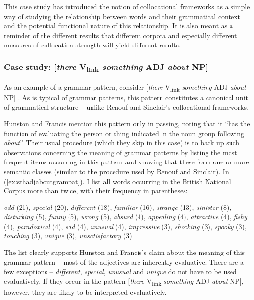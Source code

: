 This case study has introduced the notion of collocational frameworks as a simple way of studying the relationship between words and their grammatical context and the potential functional nature of this relationship. It is also meant as a reminder of the different results that different corpora and especially different measures of collocation strength will yield different results.

\subsubsection{Case study: [\textit{there} V\textsubscript{link} \textit{something} ADJ \textit{about} NP]}
\label{sec:itbeadto}

As an example of a grammar pattern, consider [\textit{there} V\textsubscript{link} \textit{something} ADJ \textit{about} NP] \citep[105--106]{hunston_pattern_2000}. As is typical of grammar patterns, this pattern constitutes a canonical unit of grammatical structure -- unlike Renouf and Sinclair's collocational frameworks.

Hunston and Francis mention this pattern only in passing, noting that it ``has the function of evaluating the person or thing indicated in the noun group following \textit{about}''. Their usual procedure (which they skip in this case) is to back up such observations concerning the meaning of grammar patterns by listing the most frequent items occurring in this pattern and showing that these form one or more semantic classes (similar to the procedure used by Renouf and Sinclair). In (\ref{ex:sthadjaboutgrampat}), I list all words occurring in the British National Corpus more than twice, with their frequency in parentheses:

\begin{exe}
\ex \textit{odd} (21), \textit{special} (20), \textit{different} (18), \textit{familiar} (16), \textit{strange} (13), \textit{sinister} (8), \textit{disturbing} (5), \textit{funny} (5), \textit{wrong} (5), \textit{absurd} (4), \textit{appealing} (4), \textit{attractive} (4), \textit{fishy} (4), \textit{paradoxical} (4), \textit{sad} (4), \textit{unusual} (4), \textit{impressive} (3), \textit{shocking} (3), \textit{spooky} (3), \textit{touching} (3), \textit{unique} (3), \textit{unsatisfactory} (3)
\label{ex:sthadjaboutgrampat}
\end{exe}

The list clearly supports Hunston and Francis's claim about the meaning of this grammar pattern -- most of the adjectives are inherently evaluative. There are a few exceptions -- \textit{different}, \textit{special}, \textit{unusual} and \textit{unique} do not have to be used evaluatively. If they occur in the pattern [\textit{there} V\textsubscript{link} \textit{something} ADJ \textit{about} NP], however, they are likely to be interpreted evaluatively.

